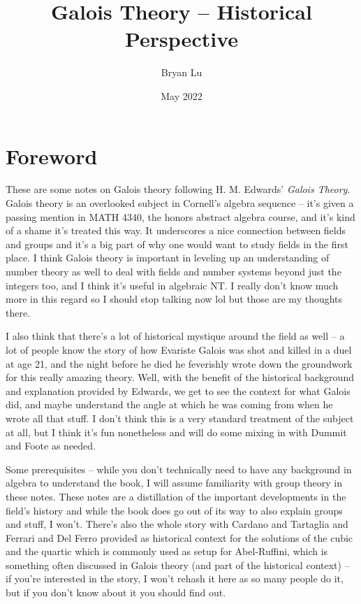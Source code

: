 \documentclass[12pt]{scrartcl}
\title{Galois Theory -- Historical Perspective}
\author{Bryan Lu}
\date{May 2022} %
\begin{document}
\maketitle

\setcounter{section}{-1}
\section{Foreword}
These are some notes on Galois theory following H. M. Edwards' \textit{Galois Theory}. Galois theory is an overlooked subject in Cornell's algebra sequence -- it's given a passing mention in MATH 4340, the honors abstract algebra course, and it's kind of a shame it's treated this way. It underscores a nice connection between fields and groups and it's a big part of why one would want to study fields in the first place. I think Galois theory is important in leveling up an understanding of number theory as well to deal with fields and number systems beyond just the integers too, and I think it's useful in algebraic NT. I really don't know much more in this regard so I should stop talking now lol but those are my thoughts there.

I also think that there's a lot of historical mystique around the field as well -- a lot of people know the story of how Evariste Galois was shot and killed in a duel at age 21, and the night before he died he feverishly wrote down the groundwork for this really amazing theory. Well, with the benefit of the historical background and explanation provided by Edwards, we get to see the context for what Galois did, and maybe understand the angle at which he was coming from when he wrote all that stuff. I don't think this is a very standard treatment of the subject at all, but I think it's fun nonetheless and will do some mixing in with Dummit and Foote as needed.

Some prerequisites -- while you don't technically need to have any background in algebra to understand the book, I will assume familiarity with group theory in these notes. These notes are a distillation of the important developments in the field's history and while the book does go out of its way to also explain groups and stuff, I won't. There's also the whole story with Cardano and Tartaglia and Ferrari and Del Ferro provided as historical context for the solutions of the cubic and the quartic which is commonly used as setup for Abel-Ruffini, which is something often discussed in Galois theory (and part of the historical context) -- if you're interested in the story, I won't rehash it here as so many people do it, but if you don't know about it you should find out.
\end{document}
